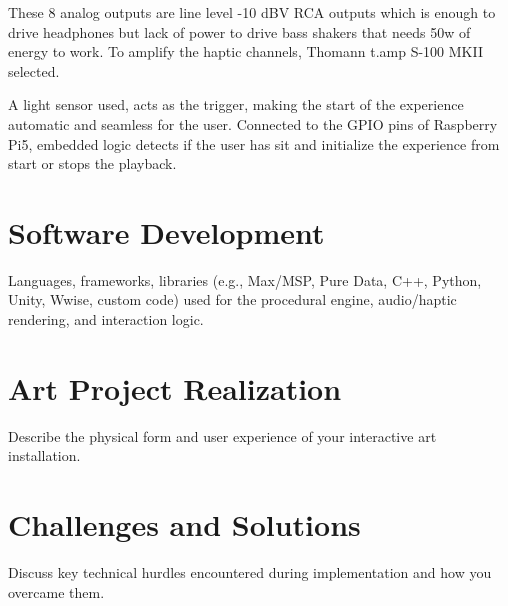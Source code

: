         These 8 analog outputs are line level -10 dBV RCA outputs which is enough to drive headphones but lack of power to drive bass shakers that needs 50w of energy to work. To amplify the haptic channels, Thomann t.amp S-100 MKII selected.\par

        A light sensor used, acts as the trigger, making the start of the experience automatic and seamless for the user. Connected to the GPIO pins of Raspberry Pi5, embedded logic detects if the user has sit and initialize the experience from start or stops the playback.\par
    \section{Software Development} Languages, frameworks, libraries (e.g., Max/MSP, Pure Data, C++, Python, Unity, Wwise, custom code) used for the procedural engine, audio/haptic rendering, and interaction logic.
    \section{Art Project Realization} Describe the physical form and user experience of your interactive art installation.
    \section{Challenges and Solutions} Discuss key technical hurdles encountered during implementation and how you overcame them.